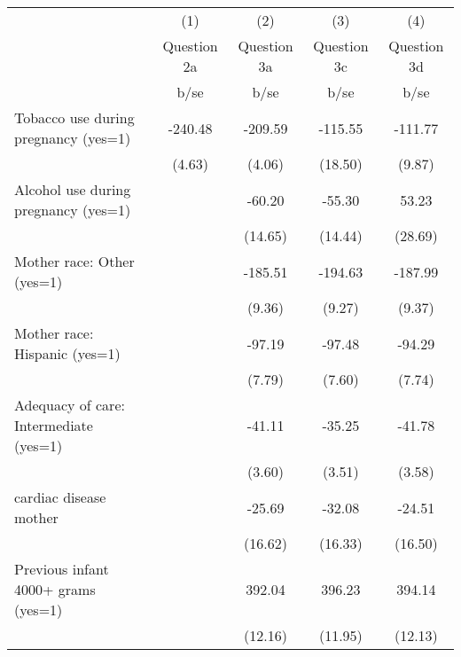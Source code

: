 {
\def\sym#1{\ifmmode^{#1}\else\(^{#1}\)\fi}
\begin{tabular}{l*{4}{c}}
\hline\hline
                                                  &\multicolumn{1}{c}{(1)}&\multicolumn{1}{c}{(2)}&\multicolumn{1}{c}{(3)}&\multicolumn{1}{c}{(4)}\\
                                                  & Question 2a& Question 3a& Question 3c& Question 3d\\
                                                  &        b/se&        b/se&        b/se&        b/se\\
\hline
Tobacco use during pregnancy (yes=1)              &     -240.48&     -209.59&     -115.55&     -111.77\\
                                                  &      (4.63)&      (4.06)&     (18.50)&      (9.87)\\
Alcohol use during pregnancy (yes=1)              &            &      -60.20&      -55.30&       53.23\\
                                                  &            &     (14.65)&     (14.44)&     (28.69)\\
Mother race: Other (yes=1)                        &            &     -185.51&     -194.63&     -187.99\\
                                                  &            &      (9.36)&      (9.27)&      (9.37)\\
Mother race: Hispanic (yes=1)                     &            &      -97.19&      -97.48&      -94.29\\
                                                  &            &      (7.79)&      (7.60)&      (7.74)\\
Adequacy of care: Intermediate (yes=1)            &            &      -41.11&      -35.25&      -41.78\\
                                                  &            &      (3.60)&      (3.51)&      (3.58)\\
cardiac disease mother                            &            &      -25.69&      -32.08&      -24.51\\
                                                  &            &     (16.62)&     (16.33)&     (16.50)\\
Previous infant 4000+ grams (yes=1)               &            &      392.04&      396.23&      394.14\\
                                                  &            &     (12.16)&     (11.95)&     (12.13)\\

\end{tabular}}
